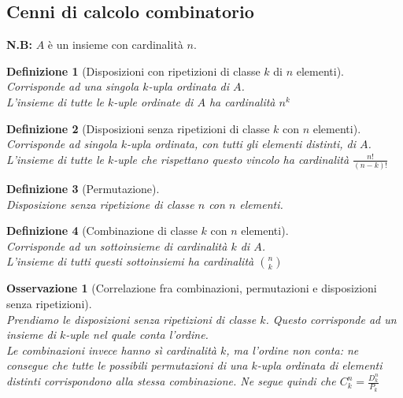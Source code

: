 \documentclass{article}
\newtheorem{definition}{Definizione}[section]
\newtheorem{osservation}{Osservazione}[section]
\begin{document}
    \subsection{Cenni di calcolo combinatorio}
        \textbf{N.B:} $A$ è un insieme con cardinalità $n$. \\
        \begin{definition}[Disposizioni con ripetizioni di classe $k$ di $n$ elementi] \, \\
            Corrisponde ad una singola $k$-upla ordinata di $A$. \\
            L'insieme di tutte le $k$-uple ordinate di $A$ ha cardinalità $n^k$
        \end{definition}
        \begin{definition}[Disposizioni senza ripetizioni di classe $k$ con $n$ elementi] \, \\
            Corrisponde ad singola $k$-upla ordinata, con tutti gli elementi distinti, di $A$. \\
            L'insieme di tutte le $k$-uple che rispettano questo vincolo ha cardinalità $\frac{n!}{\left(n-k\right)!}$
        \end{definition}
        \begin{definition}[Permutazione] \, \\
            Disposizione senza ripetizione di classe $n$ con $n$ elementi. 
        \end{definition}
        \begin{definition}[Combinazione di classe $k$ con $n$ elementi] \, \\
            Corrisponde ad un sottoinsieme di cardinalità $k$ di $A$. \\
            L'insieme di tutti questi sottoinsiemi ha cardinalità $\binom{n}{k}$
        \end{definition}
        \begin{osservation}[Correlazione fra combinazioni, permutazioni e disposizioni senza ripetizioni] \, \\
            Prendiamo le disposizioni senza ripetizioni di classe $k$. Questo corrisponde ad un insieme di 
            $k$-uple nel quale conta l'ordine. \\
            Le combinazioni invece hanno sì cardinalità $k$, ma l'ordine non conta: ne consegue 
            che tutte le possibili permutazioni di una $k$-upla ordinata di elementi distinti 
            corrispondono alla stessa combinazione. Ne segue quindi che $C^n_k = \frac{D^n_k}{P_k}$
        \end{osservation}
\end{document}
